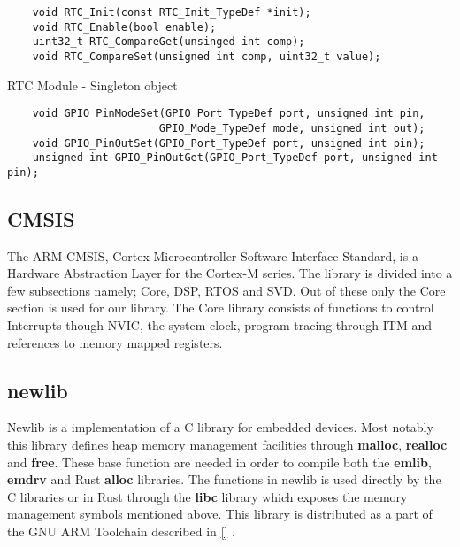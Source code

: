 \begin{listing}[H]
  \begin{verbatim}
    void RTC_Init(const RTC_Init_TypeDef *init);
    void RTC_Enable(bool enable);
    uint32_t RTC_CompareGet(unsinged int comp);
    void RTC_CompareSet(unsigned int comp, uint32_t value);
  \end{verbatim}
  \caption{RTC Module - Singleton object}
  \label{lst:back:lib:rtc}
\end{listing}

\begin{listing}[H]
  \begin{verbatim}
    void GPIO_PinModeSet(GPIO_Port_TypeDef port, unsigned int pin,
                        GPIO_Mode_TypeDef mode, unsigned int out);
    void GPIO_PinOutSet(GPIO_Port_TypeDef port, unsigned int pin);
    unsigned int GPIO_PinOutGet(GPIO_Port_TypeDef port, unsigned int pin);
  \end{verbatim}
  \caption{}
  \label{lst:back:lib:gpio}
\end{listing}



\subsection{CMSIS}

The ARM CMSIS, Cortex Microcontroller Software Interface Standard, is a Hardware Abstraction Layer for the Cortex-M series.
The library is divided into a few subsections namely; Core, DSP, RTOS and SVD.
Out of these only the Core section is used for our library.
The Core library consists of functions to control Interrupts though NVIC, the system clock, program tracing through ITM and references to memory mapped registers.


\subsection{newlib}

Newlib is a implementation of a C library for embedded devices.
Most notably this library defines heap memory management facilities through \textbf{malloc}, \textbf{realloc} and \textbf{free}.
These base function are needed in order to compile both the \textbf{emlib}, \textbf{emdrv} and Rust \textbf{alloc} libraries.
The functions in newlib is used directly by the C libraries or in Rust through the \textbf{libc} library which exposes the memory management symbols mentioned above.
This library is distributed as a part of the GNU ARM Toolchain described in \autoref{} .

